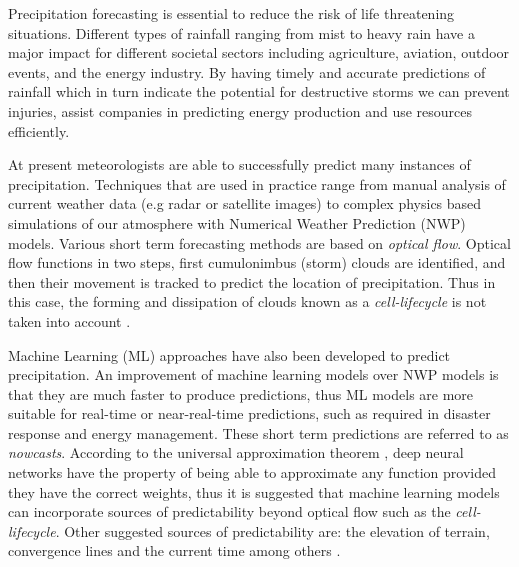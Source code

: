 Precipitation forecasting is essential to reduce the risk of life threatening situations. Different types of rainfall ranging from mist to heavy rain have a major impact for different societal sectors including agriculture, aviation, outdoor events, and the energy industry.
By having timely and accurate predictions of rainfall which in turn indicate the potential for destructive storms we can prevent injuries, assist companies in predicting energy production and use resources efficiently.
\medskip


At present meteorologists are able to successfully predict many instances of precipitation. Techniques that are used in practice range from manual analysis of current weather data (e.g radar or satellite images) to complex physics based simulations of our atmosphere with Numerical Weather Prediction (\textsc{NWP}) models.
Various short term forecasting methods are based on \textit{optical flow}. Optical flow functions in two steps, first cumulonimbus (storm) clouds are identified, and then their movement is tracked to predict the location of precipitation. Thus in this case, the forming and dissipation of clouds known as a \textit{cell-lifecycle} \cite{noaas-national-weather-service-no-date} is not taken into account \cite{prudden2020review}.
\medskip

Machine Learning (\textsc{ML}) approaches have also been developed to predict precipitation.
An improvement of machine learning models over \textsc{NWP} models is that they are much faster to produce predictions, thus ML models are more suitable for real-time or near-real-time predictions, such as required in disaster response and energy management. These short term predictions are referred to as \textit{nowcasts}. According to the universal approximation theorem \cite{cybenko-1989}, deep neural networks have the property of being able to approximate any function provided they have the correct weights, thus it is suggested that machine learning models can incorporate sources of predictability beyond optical flow such as the \textit{cell-lifecycle}.
Other suggested sources of predictability are: the elevation of terrain, convergence lines and the current time among others \cite{prudden2020review}.
\medskip

